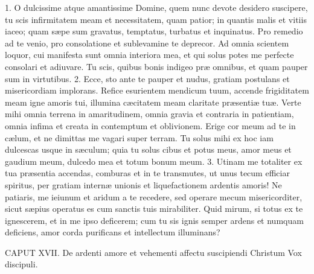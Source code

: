 \documentclass[twoside]{article}
\begin{document}
1. O dulcissime atque amantissime Domine, quem nunc devote desidero suscipere, tu scis infirmitatem meam et necessitatem, quam patior; in quantis malis et vitiis iaceo; quam sæpe sum gravatus, temptatus, turbatus et inquinatus. Pro remedio ad te venio, pro consolatione et sublevamine te deprecor. Ad omnia scientem loquor, cui manifesta sunt omnia interiora mea, et qui solus potes me perfecte consolari et adiuvare. Tu scis, quibus bonis indigeo præ omnibus, et quam pauper sum in virtutibus.
2. Ecce, sto ante te pauper et nudus, gratiam postulans et misericordiam implorans. Refice esurientem mendicum tuum, accende frigiditatem meam igne amoris tui, illumina cæcitatem meam claritate præsentiæ tuæ. Verte mihi omnia terrena in amaritudinem, omnia gravia et contraria in patientiam, omnia infima et creata in contemptum et oblivionem. Erige cor meum ad te in cælum, et ne dimittas me vagari super terram. Tu solus mihi ex hoc iam dulcescas usque in sæculum; quia tu solus cibus et potus meus, amor meus et gaudium meum, dulcedo mea et totum bonum meum.
3. Utinam me totaliter ex tua præsentia accendas, comburas et in te transmutes, ut unus tecum efficiar spiritus, per gratiam internæ unionis et liquefactionem ardentis amoris! Ne patiaris, me ieiunum et aridum a te recedere, sed operare mecum misericorditer, sicut sæpius operatus es cum sanctis tuis mirabiliter. Quid mirum, si totus ex te ignescerem, et in me ipso deficerem; cum tu sis ignis semper ardens et numquam deficiens, amor corda purificans et intellectum illuminans?


CAPUT XVII.
De ardenti amore et vehementi affectu suscipiendi Christum
Vox discipuli.
\end{document}
